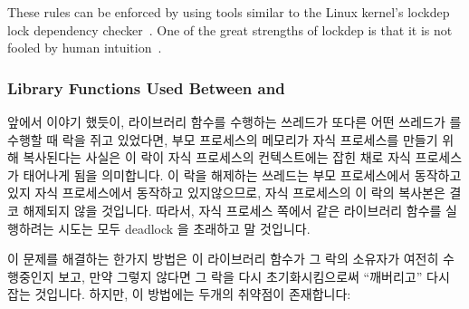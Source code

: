 These rules can be enforced by using tools similar to
the Linux kernel's lockdep lock dependency
checker~\cite{JonathanCorbet2006lockdep}.
One of the great strengths of lockdep is that it is not fooled by
human intuition~\cite{StevenRostedt2011locdepCryptic}.
\fi

\subsubsection{Library Functions Used Between  and }
\label{sec:locking:Library Functions Used Between fork() and exec()}

앞에서 이야기 했듯이, 라이브러리 함수를 수행하는 쓰레드가 또다른 어떤 쓰레드가
 를 수행할 때 락을 쥐고 있었다면, 부모 프로세스의 메모리가 자식
프로세스를 만들기 위해 복사된다는 사실은 이 락이 자식 프로세스의 컨텍스트에는
잡힌 채로 자식 프로세스가 태어나게 됨을 의미합니다.
이 락을 해제하는 쓰레드는 부모 프로세스에서 동작하고 있지 자식 프로세스에서
동작하고 있지않으므로, 자식 프로세스의 이 락의 복사본은 결코 해제되지 않을
것입니다.
따라서, 자식 프로세스 쪽에서 같은 라이브러리 함수를 실행하려는 시도는 모두
deadlock 을 초래하고 말 것입니다.

이 문제를 해결하는 한가지 방법은 이 라이브러리 함수가 그 락의 소유자가 여전히
수행중인지 보고, 만약 그렇지 않다면 그 락을 다시 초기화시킴으로써 ``깨버리고''
다시 잡는 것입니다.
하지만, 이 방법에는 두개의 취약점이 존재합니다:

